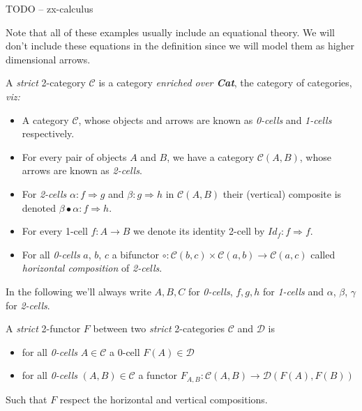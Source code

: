 \documentclass[a4paper]{article}
\begin{document}
\begin{example}  \label{ex:zx-calculus}
  TODO -- zx-calculus
\end{example}

\noindent
Note that all of these examples usually include an equational theory.
We will don't include these equations in the  definition since we will
model them as higher dimensional arrows.


\begin{definition}  \label{def:strict-two-cat}
  A \emph{strict} 2-category $\mathcal{C}$ is a category \emph{enriched over
    \textbf{Cat}}, the category of categories, \emph{viz:}
  \begin{itemize}
    \item A category $\mathcal{C}$, whose objects and arrows are known as
      \emph{0-cells} and \emph{1-cells} respectively.
    \item For every pair of objects $A$ and $B$, we have a
      category $\mathcal{C}(A, B)$, whose arrows are known as \emph{2-cells}.
    \item For \emph{2-cells} $\alpha : f \Rightarrow g$ and $\beta : g
      \Rightarrow h$ in $\mathcal{C}(A,B)$ their (vertical) composite is denoted
      $\beta \bullet \alpha : f \Rightarrow h$.
    \item For every 1-cell $f:A\to B$ we denote its identity 2-cell by
      $Id_f:f \Rightarrow f$.
    \item For all \emph{0-cells} $a$, $b$, $c$ a bifunctor $\circ:
      \mathcal{C}(b, c) \times \mathcal{C}(a, b) \to \mathcal{C}(a, c)$ called
      \emph{horizontal composition} of \emph{2-cells}.
  \end{itemize}
\end{definition}

\noindent
In the following we'll always write $A, B, C$ for \emph{0-cells}, $f,
g, h$ for \emph{1-cells} and $\alpha$, $\beta$, $\gamma$ for
\emph{2-cells}.

\begin{definition} \label{def:two-functor}
  A \emph{strict} 2-functor $F$ between two \emph{strict} 2-categories
    $\mathcal{C}$ and $\mathcal{D}$ is
  \begin{itemize}
    \item for all \emph{0-cells} $A \in \mathcal{C}$ a 0-cell $F(A) \in
      \mathcal{D}$
    \item for all \emph{0-cells} $(A, B) \in \mathcal{C}$ a functor $F_{A, B}:
      \mathcal{C}(A, B) \to \mathcal{D}(F(A), F(B))$
  \end{itemize}

  \noindent
  Such that $F$ respect the horizontal and vertical compositions.
\end{definition}
\end{document}
